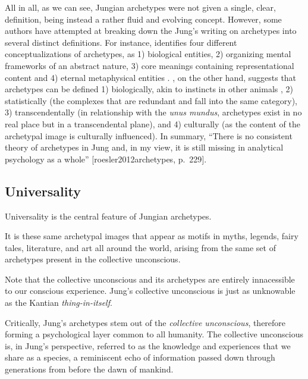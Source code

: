 \documentclass[
]{book}
\begin{document}
All in all, as we can see, Jungian archetypes were not given a single, clear, definition, being instead a rather fluid and evolving concept. However, some authors have attempted at breaking down the Jung's writing on archetypes into several distinct definitions. For instance, \citet{knox2003archetype} identifies four different conceptualizations of archetypes, as 1) biological entities, 2) organizing mental frameworks of an abstract nature, 3) core meanings containing representational content and 4) eternal metaphysical entities \citep[p.~24]{knox2003archetype}. \citet{roesler2012archetypes}, on the other hand, suggests that archetypes can be defined 1) biologically, akin to instincts in other animals \citep[``an archetype works in a human being in the same way as an instinct which, for example, makes birds build their nest in a certain way'';][]{jung1949foreword}, 2) statistically (the complexes that are redundant and fall into the same category), 3) transcendentally (in relationship with the \emph{unus mundus}, archetypes exist in no real place but in a transcendental plane), and 4) culturally (as the content of the archetypal image is culturally influenced). In summary, ``There is no consistent theory of archetypes in Jung and, in my view, it is still missing in analytical psychology as a whole'' {[}roesler2012archetypes, p.~229{]}.

\hypertarget{universality}{%
\subsection{Universality}\label{universality}}

Universality is the central feature of Jungian archetypes.

It is these same archetypal images that appear as motifs in myths, legends, fairy tales, literature, and art all around the world, arising from the same set of archetypes present in the collective unconscious.

Note that the collective unconscious and its archetypes are entirely innacessible to our conscious experience. Jung's collective unconscious is just as unknowable as the Kantian \emph{thing-in-itself}.

Critically, Jung's archetypes stem out of the \emph{collective unconscious}, therefore forming a psychological layer common to all humanity. The collective unconscious is, in Jung's perspective, referred to as the knowledge and experiences that we share as a species, a reminiscent echo of information passed down through generations from before the dawn of mankind.
\end{document}

